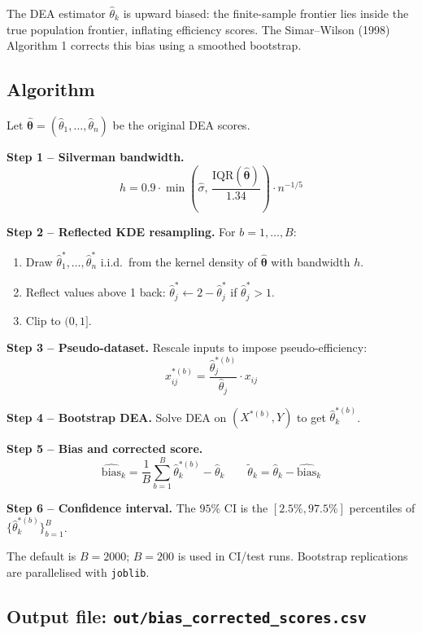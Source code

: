\documentclass[12pt,a4paper]{article}
\begin{document}
The DEA estimator $\hat{\theta}_k$ is upward biased: the finite-sample frontier
lies inside the true population frontier, inflating efficiency scores.
The Simar--Wilson (1998) Algorithm 1 corrects this bias using a smoothed bootstrap.

\subsection{Algorithm}

Let $\hat{\boldsymbol{\theta}} = (\hat{\theta}_1, \ldots, \hat{\theta}_n)$ be the
original DEA scores.

\textbf{Step 1 -- Silverman bandwidth.}
\[
    h = 0.9 \cdot \min\!\left(\hat{\sigma},\, \frac{\text{IQR}(\hat{\boldsymbol{\theta}})}{1.34}\right)
    \cdot n^{-1/5}
\]

\textbf{Step 2 -- Reflected KDE resampling.}  For $b = 1, \ldots, B$:
\begin{enumerate}[label=\alph*.]
    \item Draw $\hat{\theta}_1^*, \ldots, \hat{\theta}_n^*$ i.i.d.\ from the kernel
          density of $\hat{\boldsymbol{\theta}}$ with bandwidth $h$.
    \item Reflect values above 1 back: $\hat{\theta}_j^* \leftarrow 2 - \hat{\theta}_j^*$
          if $\hat{\theta}_j^* > 1$.
    \item Clip to $(0, 1]$.
\end{enumerate}

\textbf{Step 3 -- Pseudo-dataset.}  Rescale inputs to impose pseudo-efficiency:
\[
    x_{ij}^{*(b)} = \frac{\hat{\theta}_j^{*(b)}}{\hat{\theta}_j} \cdot x_{ij}
\]

\textbf{Step 4 -- Bootstrap DEA.}  Solve DEA on $(X^{*(b)}, Y)$ to get
$\hat{\theta}_k^{*(b)}$.

\textbf{Step 5 -- Bias and corrected score.}
\[
    \widehat{\text{bias}}_k = \frac{1}{B}\sum_{b=1}^{B} \hat{\theta}_k^{*(b)} - \hat{\theta}_k
    \qquad
    \tilde{\theta}_k = \hat{\theta}_k - \widehat{\text{bias}}_k
\]

\textbf{Step 6 -- Confidence interval.}  The $95\%$ CI is the $[2.5\%, 97.5\%]$
percentiles of $\{\hat{\theta}_k^{*(b)}\}_{b=1}^{B}$.

The default is $B = 2000$; $B = 200$ is used in CI/test runs.
Bootstrap replications are parallelised with \texttt{joblib}.

\subsection{Output file: \texttt{out/bias\_corrected\_scores.csv}}
\end{document}
